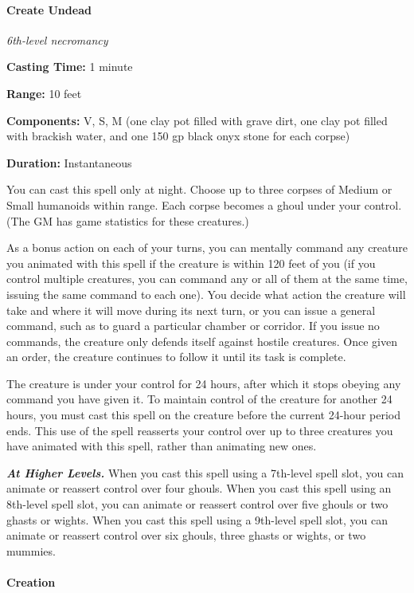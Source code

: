 \documentclass[
]{article}
\begin{document}
\hypertarget{create-undead}{%
\paragraph{Create Undead}\label{create-undead}}

\emph{6th-level necromancy}

\textbf{Casting Time:} 1 minute

\textbf{Range:} 10 feet

\textbf{Components:} V, S, M (one clay pot filled with grave dirt, one
clay pot filled with brackish water, and one 150 gp black onyx stone for
each corpse)

\textbf{Duration:} Instantaneous

You can cast this spell only at night. Choose up to three corpses of
Medium or Small humanoids within range. Each corpse becomes a ghoul
under your control. (The GM has game statistics for these creatures.)

As a bonus action on each of your turns, you can mentally command any
creature you animated with this spell if the creature is within 120 feet
of you (if you control multiple creatures, you can command any or all of
them at the same time, issuing the same command to each one). You decide
what action the creature will take and where it will move during its
next turn, or you can issue a general command, such as to guard a
particular chamber or corridor. If you issue no commands, the creature
only defends itself against hostile creatures. Once given an order, the
creature continues to follow it until its task is complete.

The creature is under your control for 24 hours, after which it stops
obeying any command you have given it. To maintain control of the
creature for another 24 hours, you must cast this spell on the creature
before the current 24-hour period ends. This use of the spell reasserts
your control over up to three creatures you have animated with this
spell, rather than animating new ones.

\emph{\textbf{At Higher Levels.}} When you cast this spell using a
7th-level spell slot, you can animate or reassert control over four
ghouls. When you cast this spell using an 8th-level spell slot, you can
animate or reassert control over five ghouls or two ghasts or wights.
When you cast this spell using a 9th-level spell slot, you can animate
or reassert control over six ghouls, three ghasts or wights, or two
mummies.

\hypertarget{creation}{%
\paragraph{Creation}\label{creation}}
\end{document}
